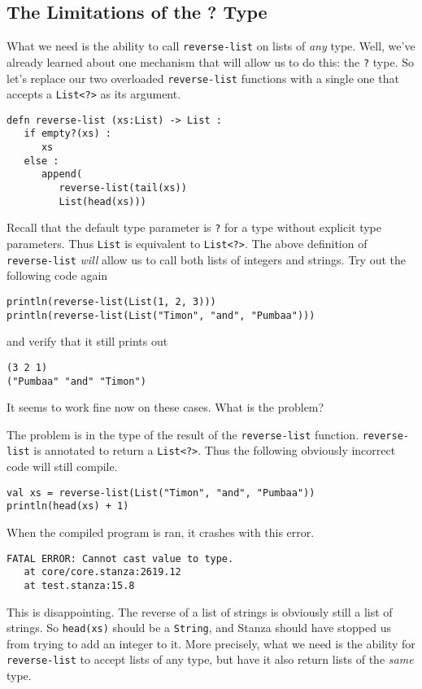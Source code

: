 \documentclass[10pt,oneside]{book}
\begin{document}
\subsection*{The Limitations of the ? Type}
What we need is the ability to call \texttt{\frenchspacing reverse-list} on lists of {\em any} type. Well, we've already learned about one mechanism that will allow us to do this: the \texttt{\frenchspacing ?} type. So let's replace our two overloaded \texttt{\frenchspacing reverse-list} functions with a single one that accepts a \texttt{\frenchspacing List<?>} as its argument.
\begin{lstlisting}
defn reverse-list (xs:List) -> List :
   if empty?(xs) :
      xs
   else :
      append(
         reverse-list(tail(xs))
         List(head(xs)))
\end{lstlisting}
Recall that the default type parameter is \texttt{\frenchspacing ?} for a type without explicit type parameters. Thus \texttt{\frenchspacing List} is equivalent to \texttt{\frenchspacing List<?>}. The above definition of \texttt{\frenchspacing reverse-list} {\em will} allow us to call both lists of integers and strings. Try out the following code again
\begin{lstlisting}
println(reverse-list(List(1, 2, 3)))
println(reverse-list(List("Timon", "and", "Pumbaa")))
\end{lstlisting}
and verify that it still prints out
\begin{lstlisting}
(3 2 1)
("Pumbaa" "and" "Timon")
\end{lstlisting}
It seems to work fine now on these cases. What is the problem? 

The problem is in the type of the result of the \texttt{\frenchspacing reverse-list} function. \texttt{\frenchspacing reverse-list} is annotated to return a \texttt{\frenchspacing List<?>}. Thus the following obviously incorrect code will still compile.
\begin{lstlisting}
val xs = reverse-list(List("Timon", "and", "Pumbaa"))
println(head(xs) + 1)
\end{lstlisting} 
When the compiled program is ran, it crashes with this error.
\begin{lstlisting}
FATAL ERROR: Cannot cast value to type.
   at core/core.stanza:2619.12
   at test.stanza:15.8
\end{lstlisting}
This is disappointing. The reverse of a list of strings is obviously still a list of strings. So \texttt{\frenchspacing head(xs)} should be a \texttt{\frenchspacing String}, and Stanza should have stopped us from trying to add an integer to it. More precisely, what we need is the ability for \texttt{\frenchspacing reverse-list} to accept lists of any type, but have it also return lists of the {\em same} type.
\end{document}
